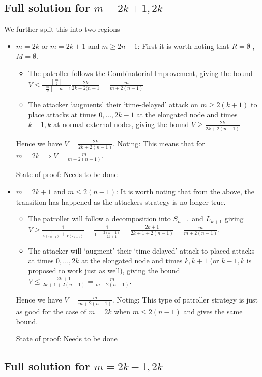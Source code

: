 \documentclass[a4paper,10pt]{article}
\newcommand{\floor}[1]{\left \lfloor #1 \right \rfloor}
\theoremstyle{definition}
\theoremstyle{definition}
\theoremstyle{remark}
\theoremstyle{definition}
\begin{document}
\subsection[]{Full solution for $m=2k+1,2k$}
We further split this into two regions
\begin{itemize}
\item $m=2k$ or $m=2k+1$ and $m \geq 2n-1$:
 First it is worth noting that $R=\emptyset$ , $M=\emptyset$.
 \begin{itemize}
 \item The patroller follows the Combinatorial Improvement, giving the bound $V \leq \frac{\floor{\frac{m}{2}}}{\floor{\frac{m}{2}}+n-1} \frac{2k}{2k+2(n-1} = \frac{m}{m+2(n-1)}$
 \item The attacker `augments' their `time-delayed' attack on $m \geq 2(k+1)$ to place attacks at times $0,...,2k-1$ at the elongated node and times $k-1,k$ at normal external nodes, giving the bound $V \geq \frac{2k}{2k+2(n-1)}$
 \end{itemize}
 Hence we have $V=\frac{2k}{2k+2(n-1)}$.
 Noting: This means that for $m=2k \implies V=\frac{m}{m+2(n-1)}$.
 
 State of proof: Needs to be done

\item $m=2k+1$ and $m \leq 2(n-1)$:
 It is worth noting that from the above, the transition has happened as the attackers strategy is no longer true.
 \begin{itemize}
 \item The patroller will follow a decomposition into $S_{n-1}$ and $L_{k+1}$ giving $V \geq \frac{1}{\frac{1}{V(S_{n-1})}+\frac{1}{V(L_{k+1})}}=\frac{1}{1+\frac{2(n-1)}{2k+1}}=\frac{2k+1}{2k+1+2(n-1)}=\frac{m}{m+2(n-1)}$.
 \item The attacker will `augment' their `time-delayed' attack to placed attacks at times $0,...,2k$ at the elongated node and times $k,k+1$ (or $k-1,k$ is proposed to work just as well), giving the bound $V \leq \frac{2k+1}{2k+1+2(n-1)}=\frac{m}{m+2(n-1)}$.
 \end{itemize}
 Hence we have $V=\frac{m}{m+2(n-1)}$.
 Noting: This type of patroller strategy is just as good for the case of $m=2k$ when $m \leq 2(n-1)$ and gives the same bound.
 
 State of proof: Needs to be done

\end{itemize}

\subsection[]{Full solution for $m=2k-1,2k$}
\end{document}
